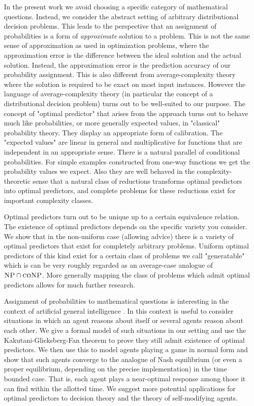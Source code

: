 \documentclass{article}
\theoremstyle{definition}
\theoremstyle{plain}
\begin{document}
In the present work we avoid choosing a specific category of mathematical questions. Instead, we consider the abstract setting of arbitrary distributional decision problems. This leads to the perspective that an assignment of probabilities is a form of \emph{approximate} solution to a problem. This is not the same sense of approximation as used in optimization problems, where the approximation error is the difference between the ideal solution and the actual solution. Instead, the approximation error is the prediction accuracy of our probability assignment. This is also different from average-complexity theory where the solution is required to be exact on most input instances. However the language of average-complexity theory (in particular the concept of a distributional decision problem) turns out to be well-suited to our purpose.
The concept of "optimal predictor" that arises from the approach turns out to behave much like probabilities, or more generally expected values, in "classical" probability theory. They display an appropriate form of calibration. The "expected values" are linear in general and multiplicative for functions that are independent in an appropriate sense. There is a natural parallel of conditional probabilities. For simple examples constructed from one-way functions we get the probability values we expect. Also they are well behaved in the complexity-theoretic sense that a natural class of reductions transforms optimal predictors into optimal predictors, and complete problems for these reductions exist for important complexity classes.

Optimal predictors turn out to be unique up to a certain equivalence relation. The existence of optimal predictors depends on the specific variety you consider. We show that in the non-uniform case (allowing advice) there is a variety of optimal predictors that exist for completely arbitrary problems. Uniform optimal predictors of this kind exist for a certain class of problems we call "generatable" which is can be very roughly regarded as an average-case analogue of $\textsc{NP} \cap \textsc{coNP}$. More generally mapping the class of problems which admit optimal predictors allows for much further research.

Assignment of probabilities to mathematical questions is interesting in the context of artificial general intelligence \cite{Hutter_2013}\cite{Christiano_2014}. In this context is useful to consider situations in which an agent reasons about itself or several agents reason about each other\cite{Fallenstein_2015}. We give a formal model of such situations in our setting and use the Kakutani-Glicksberg-Fan theorem to prove they still admit existence of optimal predictors. We then use this to model agents playing a game in normal form and show that such agents converge to the analogue of Nash equilibrium (or even a proper equilibrium, depending on the precise implementation) in the time bounded case. That is, each agent plays a near-optimal response among those it can find within the allotted time. We suggest more potential applications for optimal predictors to decision theory and the theory of self-modifying agents.
\end{document}
